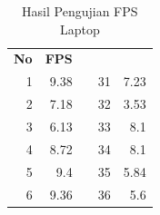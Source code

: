 \begin{table}[H]
  \centering
  \caption{Hasil Pengujian FPS Laptop}
  \label{tb:HasilPengujianFPSLaptop}
  \begin{tabular}{|r|r|l|r|r|}
  \cline{1-2} \cline{4-5}
  \multicolumn{1}{|l|}{\cellcolor[HTML]{C0C0C0}\textbf{No}} & \multicolumn{1}{l|}{\cellcolor[HTML]{C0C0C0}\textbf{FPS}} &  & \multicolumn{1}{l|}{\cellcolor[HTML]{C0C0C0}{\color[HTML]{000000} \textbf{No}}} & \multicolumn{1}{l|}{\cellcolor[HTML]{C0C0C0}{\color[HTML]{000000} \textbf{FPS}}} \\ \cline{1-2} \cline{4-5} 
  1                                                         & 9.38                                                      &  & 31                                                                              & 7.23                                                                             \\ \cline{1-2} \cline{4-5} 
  2                                                         & 7.18                                                      &  & 32                                                                              & 3.53                                                                             \\ \cline{1-2} \cline{4-5} 
  3                                                         & 6.13                                                      &  & 33                                                                              & 8.1                                                                              \\ \cline{1-2} \cline{4-5} 
  4                                                         & 8.72                                                      &  & 34                                                                              & 8.1                                                                              \\ \cline{1-2} \cline{4-5} 
  5                                                         & 9.4                                                       &  & 35                                                                              & 5.84                                                                             \\ \cline{1-2} \cline{4-5} 
  6                                                         & 9.36                                                      &  & 36                                                                              & 5.6                                                                              \\ \cline{1-2} \cline{4-5} 

\end{tabular}
\end{table}
